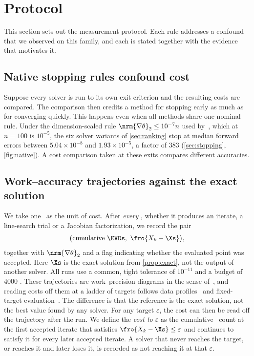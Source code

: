\section{Protocol}\label{sec:protocol}

This section sets out the measurement protocol. Each rule addresses a
confound that we observed on this family, and each is stated together with the
evidence that motivates it.

\subsection{Native stopping rules confound cost}\label{sec:native}
Suppose every solver is run to its own exit criterion and the resulting costs
are compared. The comparison then credits a method for stopping early as much
as for converging quickly. This happens even when all methods share one
nominal rule. Under the dimension-scaled rule $\nrm{\nabla\theta}_2\le10^{-7}n$
used by~\cite{huynh2025accelerated}, which at $n=100$ is $10^{-5}$, the six solver
variants of \cref{sec:ranking} stop at median forward errors between
$5.04\times10^{-8}$ and $1.93\times10^{-5}$, a factor of 383
(\cref{sec:stopping}, \cref{fig:native}). A cost comparison taken at these
exits compares different accuracies.

\subsection{Work--accuracy trajectories against the exact solution}\label{sec:traj}
We take one \EVD\ as the unit of cost. After \emph{every} \EVD, whether it
produces an iterate, a line-search trial or a Jacobian factorization, we record
the pair
\[
  \bigl(\text{cumulative \EVDs},\ \fro{X_k-\Xs}\bigr),
\]
together with $\nrm{\nabla\theta}_2$ and a flag indicating whether the
evaluated point was accepted. Here $\Xs$ is the exact solution from
\cref{prop:exact}, not the output of another solver. All runs use a common,
tight tolerance of $10^{-11}$ and a budget of 4000 \EVDs. These trajectories are work--precision diagrams in the sense
of~\cite{hairer1996solving}, and reading costs off them at a ladder of targets
follows data profiles~\cite{more2009benchmarking} and fixed-target
evaluation~\cite{hansen2021coco}. The difference is that the reference is the
exact solution, not the best value found by any solver. For any target
$\varepsilon$, the cost can then be read off the trajectory after the run. We
define the \emph{cost to $\varepsilon$} as the cumulative \EVD\ count at the
first accepted iterate that satisfies $\fro{X_k-\Xs}\le\varepsilon$ and
continues to satisfy it for every later accepted iterate. A solver that never
reaches the target, or reaches it and later loses it, is recorded as not
reaching it at that $\varepsilon$.

